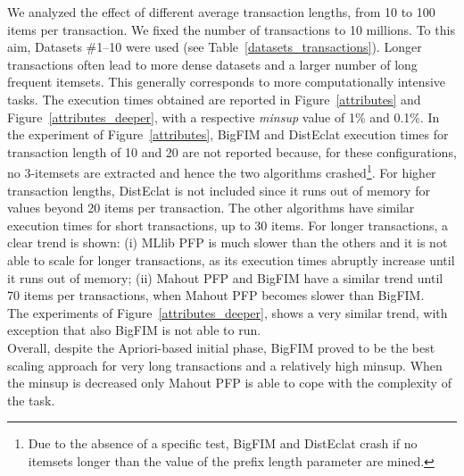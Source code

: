We analyzed the effect of different average transaction lengths,
from 10 to 100 items per transaction.
We fixed the number of transactions to 10 millions.
To this aim, Datasets \#1--10 were used (see Table~\ref{datasets_transactions}).
Longer transactions often lead to more dense datasets and a larger number of long frequent itemsets.
This generally corresponds to more computationally intensive tasks.
The execution times obtained are reported in Figure~\ref{attributes} and Figure~\ref{attributes_deeper}, with a respective {\it minsup} value of 1\% and 0.1\%.
In the experiment of Figure~\ref{attributes}, BigFIM and DistEclat execution times for transaction length of 10 and 20 are not reported because, for these configurations, no 3-itemsets are extracted and hence the two algorithms crashed\footnote{Due to the absence of a specific test, BigFIM and DistEclat crash
if no itemsets longer than the value of the prefix length parameter are mined.}.
For higher transaction lengths, DistEclat is not included since it runs out of memory
for values beyond 20 items per transaction.
The other algorithms have similar execution times for short transactions,
up to 30 items.
For longer transactions, a clear trend is shown:
(i) MLlib PFP is much slower than the others
and it is not able to scale for longer transactions,
as its execution times abruptly increase until it runs out of memory;
(ii) Mahout PFP and BigFIM have a similar trend until 70 items per transactions,
when Mahout PFP becomes slower than BigFIM.\\
The experiments of Figure~\ref{attributes_deeper}, shows a very similar trend, with exception that also BigFIM is not able to run.\\
Overall, despite the Apriori-based initial phase,
BigFIM proved to be the best scaling approach for very long transactions and a relatively high minsup. When the minsup is decreased only Mahout PFP 
is able to cope with the complexity of the task.\\


